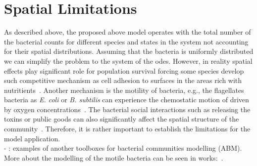 \documentclass[10pt,A4paper]{article}
\begin{document}
\section{Spatial Limitations}
As described above, the proposed above model operates with the total number of the bacterial counts for different species and states in the system not accounting for their spatial distributions.
Assuming that the bacteria is uniformly distributed we can simplify the problem to the system of the \acp{ode}.
However, in reality spatial effects play significant role for population survival forcing some species develop such competitive mechanism as cell adhesion to surfaces in the areas rich with nutritients~\cite{htuson_bacteriasurface_2013}.
Another mechanism is the motility of bacteria, e.g., the flagellates bacteria as \textit{E. coli} or \textit{B. subtilis} can experience the chemostatic motion of driven by oxygen concentrations~\cite{decoene_microscopic_2011}.
The bacterial social interactions such as releasing the toxins or public goods can also significantly affect the spatial structure of the community~\cite{blanchard_bacterial_2015}.
Therefore, it is rather important to establish the limitations for the model application.\\

- \cite{gorochowski_bsim_2012, li_nufeb_2019}: examples of another toolboxes for bacterial communities modelling (ABM).\\
More about the modelling of the motile bacteria can be seen in works:~\cite{decoene_microscopic_2011, rosser_modelling_2014, sokolov_physical_2012, li_amplified_2008}.
\end{document}
